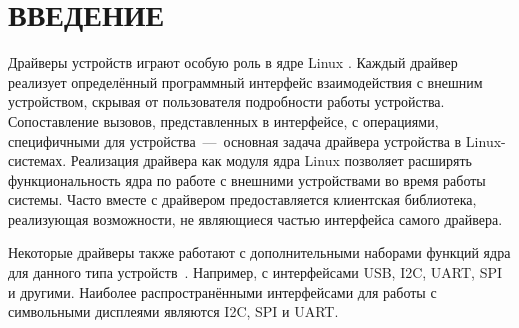 \chapter*{ВВЕДЕНИЕ}

Драйверы устройств играют особую роль в ядре Linux \cite{bib1}. Каждый драйвер реализует определённый программный интерфейс взаимодействия с внешним устройством, скрывая от пользователя подробности работы устройства. Сопоставление вызовов, представленных в интерфейсе, с операциями, специфичными для устройства~---~основная задача драйвера устройства в Linux-системах. Реализация драйвера как модуля ядра Linux позволяет расширять функциональность ядра по работе с внешними устройствами во время работы системы. Часто вместе с драйвером предоставляется клиентская библиотека, реализующая возможности, не являющиеся частью интерфейса самого драйвера.

Некоторые драйверы также работают с дополнительными наборами функций ядра для данного типа устройств~\cite{bib1}. Например, с интерфейсами USB, I2C, UART, SPI и другими. Наиболее распространёнными интерфейсами для работы с символьными дисплеями являются I2C, SPI и UART.